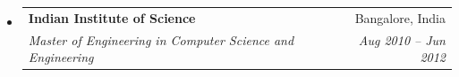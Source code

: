 \documentclass[letterpaper,11pt]{article}
\makeatletter
\newcommand{\resitem}[1]{\item #1 \vspace{-2pt}}
\newcommand{\ressubheading}[4]{
\begin{tabular*}{6.5in}{l@{\extracolsep{\fill}}r}
		\textbf{#1} & #2 \\
		\textit{#3} & \textit{#4} \\
\end{tabular*}\vspace{-6pt}}
\makeatother
\begin{document}
\begin{itemize}
		\item
			\ressubheading{{Indian Institute of Science}}{Bangalore, India}{{Master of Engineering in Computer Science and Engineering}}{Aug 2010 -- Jun 2012}
%							

\end{itemize}
\end{document}
